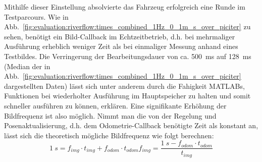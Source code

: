 Mithilfe dieser Einstellung absolvierte das Fahrzeug erfolgreich eine Runde im Testparcours. Wie in Abb.~\ref{fig:evaluation:riverflow:times_combined_1Hz_0_1m_s_over_piciter} zu sehen, benötigt ein Bild-Callback im Echtzeitbetrieb, d.h. bei mehrmaliger Ausführung erheblich weniger Zeit als bei einmaliger Messung anhand eines Testbildes. Die Verringerung der Bearbeitungsdauer  von ca. \SI{500}{\milli\second} auf \SI{128}{\milli\second} (Median der in Abb.~\ref{fig:evaluation:riverflow:times_combined_1Hz_0_1m_s_over_piciter} dargestellten Daten) lässt sich unter anderem durch die Fahigkeit MATLABs, Funktionen bei wiederholter Ausführung im Hauptspeicher zu halten und somit schneller ausführen zu können, erklären. Eine signifikante Erhöhung der Bildfrequenz  ist also möglich. Nimmt man die von der Regelung und Posenaktualisierung, d.h. dem Odometrie-Callback benötigte Zeit als konstant an, lässt sich die theoretisch mögliche Bildfrequenz wie folgt berechnen:
\begin{subequations}
\begin{equation}
	\SI{1}{s} = f_{img} \cdot t_{img} + f_{odom} \cdot t_{odom}
\end{equation}
\begin{equation}
	f_{img} = \frac{\SI{1}{s}-f_{odom} \cdot t_{odom}}{t_{img}}
\end{equation}
\end{subequations} 
